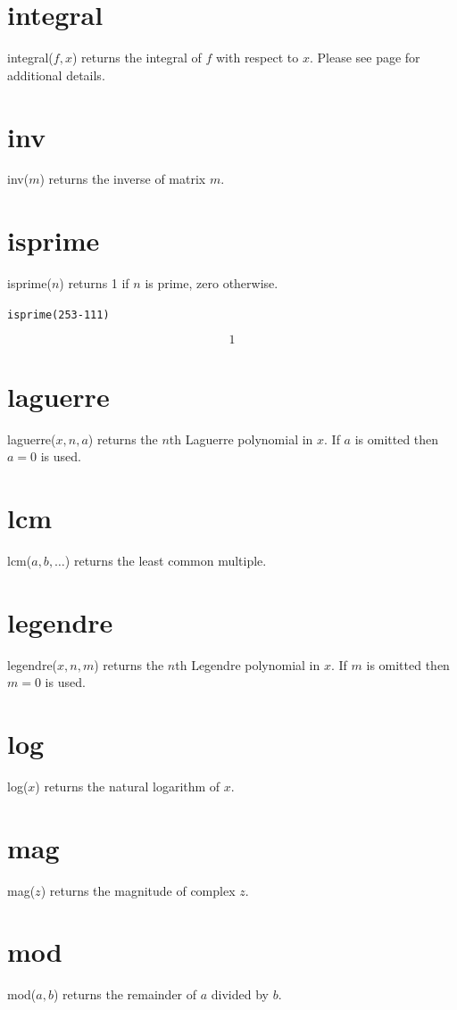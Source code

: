 \documentclass[12pt]{book}
\begin{document}
\section*{integral}
integral($f,x$) returns the integral of $f$ with respect to $x$.
Please see page \pageref{integral} for additional details.

\section*{inv}
inv($m$) returns the inverse of matrix $m$.

\section*{isprime}
isprime($n$) returns 1 if $n$ is prime, zero otherwise.

\medskip
{\tt isprime(2{}53-111)}

$$1$$

\section*{laguerre}
laguerre($x,n,a$) returns the $n$th Laguerre polynomial in $x$.
If $a$ is omitted then $a=0$ is used.

\section*{lcm}
lcm($a,b,\ldots$) returns the least common multiple.

\section*{legendre}
legendre($x,n,m$) returns the $n$th Legendre polynomial in $x$.
If $m$ is omitted then $m=0$ is used.

\section*{log}
log($x$) returns the natural logarithm of $x$.

\section*{mag}
mag($z$) returns the magnitude of complex $z$.

\section*{mod}
mod($a,b$) returns the remainder of $a$ divided by $b$.
\end{document}
